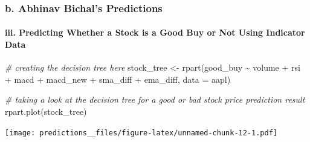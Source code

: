 \documentclass[
]{article}
\newenvironment{Shaded}{\begin{snugshade}}{\end{snugshade}}
\newcommand{\AttributeTok}[1]{\textcolor[rgb]{0.77,0.63,0.00}{#1}}
\newcommand{\CommentTok}[1]{\textcolor[rgb]{0.56,0.35,0.01}{\textit{#1}}}
\newcommand{\DecValTok}[1]{\textcolor[rgb]{0.00,0.00,0.81}{#1}}
\newcommand{\FunctionTok}[1]{\textcolor[rgb]{0.00,0.00,0.00}{#1}}
\newcommand{\NormalTok}[1]{#1}
\newcommand{\OtherTok}[1]{\textcolor[rgb]{0.56,0.35,0.01}{#1}}
\newcommand{\SpecialCharTok}[1]{\textcolor[rgb]{0.00,0.00,0.00}{#1}}
\begin{document}
\hypertarget{b.-abhinav-bichals-predictions}{%
\subsubsection{b. Abhinav Bichal's
Predictions}\label{b.-abhinav-bichals-predictions}}

\hypertarget{iii.-predicting-whether-a-stock-is-a-good-buy-or-not-using-indicator-data}{%
\paragraph{iii. Predicting Whether a Stock is a Good Buy or Not Using
Indicator
Data}\label{iii.-predicting-whether-a-stock-is-a-good-buy-or-not-using-indicator-data}}

\begin{Shaded}
\begin{Highlighting}[]
\CommentTok{\# creating the decision tree here}
\NormalTok{stock\_tree }\OtherTok{\textless{}{-}} \FunctionTok{rpart}\NormalTok{(good\_buy }\SpecialCharTok{\textasciitilde{}}\NormalTok{ volume }\SpecialCharTok{+}\NormalTok{ rsi }\SpecialCharTok{+}\NormalTok{ macd }\SpecialCharTok{+}\NormalTok{ macd\_new }\SpecialCharTok{+}\NormalTok{ sma\_diff }\SpecialCharTok{+}\NormalTok{ ema\_diff, }\AttributeTok{data =}\NormalTok{ aapl)}

\CommentTok{\# taking a look at the decision tree for a good or bad stock price prediction result}
\FunctionTok{rpart.plot}\NormalTok{(stock\_tree)}
\end{Highlighting}
\end{Shaded}

\texttt{[image: predictions\_\_files/figure-latex/unnamed-chunk-12-1.pdf]}

\begin{Shaded}
\end{Shaded}
\end{document}
